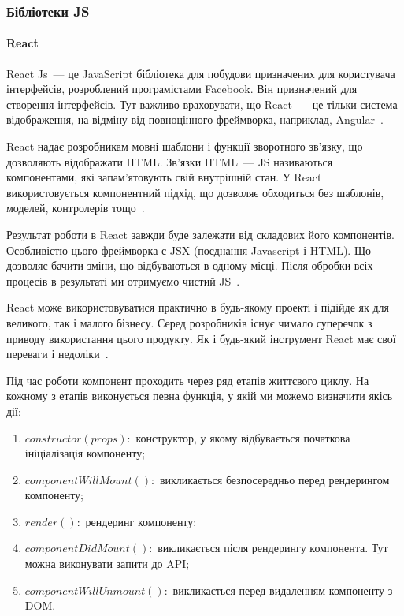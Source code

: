 \subsubsection{Бібліотеки JS}

\paragraph{React}

React Js~--- це JavaScript бібліотека для побудови призначених для користувача інтерфейсів, розроблений програмістами Facebook. Він призначений для створення інтерфейсів. Тут важливо враховувати, що React~--- це тільки система відображення, на відміну від повноцінного фреймворка, наприклад, Angular~\cite{fedosejev2015react}.

React надає розробникам мовні шаблони і функції зворотного зв'язку, що дозволяють відображати HTML. Зв'язки HTML~--- JS називаються компонентами, які запам'ятовують свій внутрішній стан. У React використовується компонентний підхід, що дозволяє обходиться без шаблонів, моделей, контролерів тощо~\cite{sagarganatra2018}.

Результат роботи в React завжди буде залежати від складових його компонентів. Особливістю цього фреймворка є JSX (поєднання Javascript і HTML). Що дозволяє бачити зміни, що відбуваються в одному місці. Після обробки всіх процесів в результаті ми отримуємо чистий JS~\cite{js.next:ecmascript6}.


React може використовуватися практично в будь-якому проекті і підійде як для великого, так і малого бізнесу. Серед розробників існує чимало суперечок з приводу використання цього продукту. Як і будь-який інструмент React має свої переваги і недоліки~\cite{caspers2017react}.

Під час роботи компонент проходить через ряд етапів життєвого циклу. На кожному з етапів виконується певна функція, у якій ми можемо визначити якісь дії:
\begin{enumerate}
    \item $constructor(props):$ конструктор, у якому відбувається початкова ініціалізація компоненту;
    \item $componentWillMount():$ викликається безпосередньо перед рендерингом компоненту;
    \item $render():$ рендеринг компоненту;
    \item $componentDidMount():$ викликається після рендерингу компонента. Тут можна виконувати запити до API;
    \item $componentWillUnmount():$ викликається перед видаленням компоненту з DOM.
\end{enumerate}

